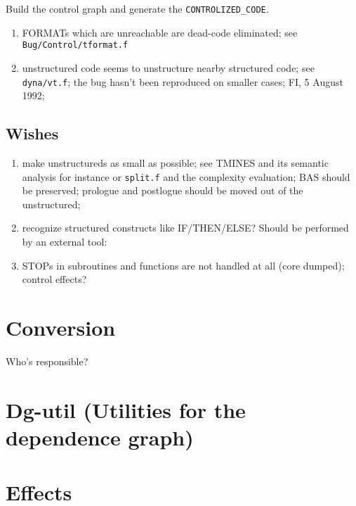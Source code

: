 Build the control graph and generate the \verb+CONTROLIZED_CODE+.

\begin{enumerate}

  \item FORMATs which are unreachable are dead-code eliminated;
        see \verb+Bug/Control/tformat.f+

  \item unstructured code seems to unstructure nearby structured code;
        see \verb+dyna/vt.f+; the bug hasn't been reproduced
        on smaller cases; FI, 5 August 1992;

\end{enumerate}

\subsection{Wishes}

\begin{enumerate}

  \item {} make unstructureds as small as possible;
        see TMINES and its semantic analysis for instance or \verb+split.f+
        and the complexity evaluation; BAS should be preserved; prologue
        and postlogue should be moved out of the unstructured;

  \item recognize structured constructs like
        IF/THEN/ELSE? Should be performed by an external tool: 

  \item STOPs in subroutines and functions are not handled at 
        all (core dumped); control effects?

\end{enumerate}

\section{Conversion}

Who's responsible?

\section{Dg-util (Utilities for the dependence graph)}

\section{Effects}

